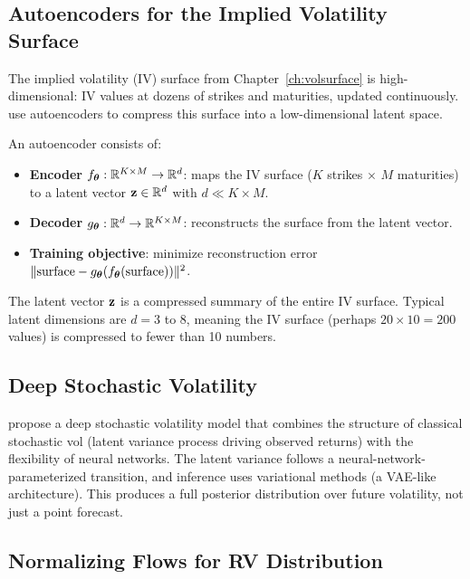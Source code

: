\subsection{Autoencoders for the Implied Volatility Surface}

The implied volatility (IV) surface from Chapter~\ref{ch:volsurface} is high-dimensional: IV values at dozens of strikes and maturities, updated continuously.
\citet{DingLuCheung2025} use autoencoders to compress this surface into a low-dimensional latent space.

\begin{definition}
An autoencoder consists of:
\begin{itemize}[nosep]
  \item \textbf{Encoder} $f_{\bm{\theta}}: \mathbb{R}^{K \times M} \to \mathbb{R}^d$: maps the IV surface ($K$ strikes $\times$ $M$ maturities) to a latent vector $\mathbf{z} \in \mathbb{R}^d$ with $d \ll K \times M$.
  \item \textbf{Decoder} $g_{\bm{\theta}}: \mathbb{R}^d \to \mathbb{R}^{K \times M}$: reconstructs the surface from the latent vector.
  \item \textbf{Training objective}: minimize reconstruction error $\|\text{surface} - g_{\bm{\theta}}(f_{\bm{\theta}}(\text{surface}))\|^2$.
\end{itemize}
The latent vector $\mathbf{z}$ is a compressed summary of the entire IV surface.
Typical latent dimensions are $d = 3$ to $8$, meaning the IV surface (perhaps $20 \times 10 = 200$ values) is compressed to fewer than 10 numbers.
\end{definition}

\subsection{Deep Stochastic Volatility}

\citet{XuChen2021} propose a deep stochastic volatility model that combines the structure of classical stochastic vol (latent variance process driving observed returns) with the flexibility of neural networks.
The latent variance follows a neural-network-parameterized transition, and inference uses variational methods (a VAE-like architecture).
This produces a full posterior distribution over future volatility, not just a point forecast.

\subsection{Normalizing Flows for RV Distribution}

